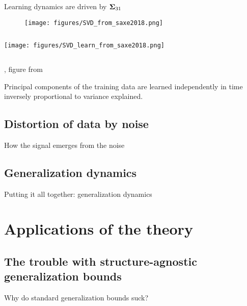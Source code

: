 \documentclass{beamer}
\begin{document}
\begin{frame}{Learning dynamics are driven by ${\bf\Sigma}_{31}$}
\begin{figure}
\centering
\texttt{[image: figures/SVD\_from\_saxe2018.png]}
\end{figure}
\begin{columns}
\begin{column}{0.5\textwidth}
\texttt{[image: figures/SVD\_learn\_from\_saxe2018.png]}
\end{column}
\begin{column}{0.5\textwidth}
\centering
{}
\end{column}
\end{columns}
{\footnotesize \citep{Saxe2013}, figure from \citep{Saxe2018}}
\end{frame}

\begin{frame}[standout]
Principal components of the training data are learned independently in time inversely proportional to variance explained.
\end{frame}

\subsection{Distortion of data by noise}
\begin{frame}{How the signal emerges from the noise}

\end{frame}

\subsection{Generalization dynamics}
\begin{frame}{Putting it all together: generalization dynamics}

\end{frame}


\section{Applications of the theory}

\subsection{The trouble with structure-agnostic generalization bounds}
\begin{frame}{Why do standard generalization bounds suck?}
\end{frame}
\end{document}
